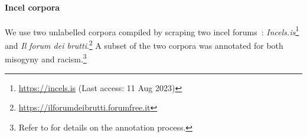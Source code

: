 \documentclass[11pt]{article}
\newcommand{\abc}[1]{{\color{blue} #1}}
\newcommand{\todoA}[1]{\todo[color=blue!40]{A: #1}}
\newcommand{\enforum}{\textit{Incels.is}}
\newcommand{\itforum}{\textit{Il forum dei brutti}}
\begin{document}
\paragraph{Incel corpora}
We use two \abc{unlabelled} corpora compiled by scraping two incel forums~\cite{gajo2023identification}: \textit{\enforum}\footnote{\url{https://incels.is} (Last access: 11 Aug 2023)} and \textit{\itforum}.\footnote{\url{https://ilforumdeibrutti.forumfree.it}}
A subset of the two corpora was annotated for both misogyny and racism.\footnote{Refer to  for details on the annotation process.} %
\end{document}
